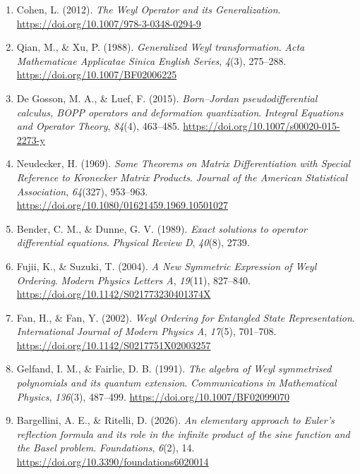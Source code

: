 {\begin{enumerate}
		\item Cohen, L. (2012). \textit{The Weyl Operator and its Generalization}. \url{https://doi.org/10.1007/978-3-0348-0294-9}
		
		\item Qian, M., \& Xu, P. (1988). \textit{Generalized Weyl transformation}. \textit{Acta Mathematicae Applicatae Sinica English Series}, \textit{4}(3), 275--288. \url{https://doi.org/10.1007/BF02006225}
		
		\item De Gosson, M. A., \& Luef, F. (2015). \textit{Born--Jordan pseudodifferential calculus, BOPP operators and deformation quantization}. \textit{Integral Equations and Operator Theory}, \textit{84}(4), 463--485. \url{https://doi.org/10.1007/s00020-015-2273-y}
		
		\item Neudecker, H. (1969). \textit{Some Theorems on Matrix Differentiation with Special Reference to Kronecker Matrix Products}. \textit{Journal of the American Statistical Association}, \textit{64}(327), 953--963. \url{https://doi.org/10.1080/01621459.1969.10501027}
		
		\item Bender, C. M., \& Dunne, G. V. (1989). \textit{Exact solutions to operator differential equations}. \textit{Physical Review D}, \textit{40}(8), 2739.
		
		\item Fujii, K., \& Suzuki, T. (2004). \textit{A New Symmetric Expression of Weyl Ordering}. \textit{Modern Physics Letters A}, \textit{19}(11), 827--840. \url{https://doi.org/10.1142/S021773230401374X}
		
		\item Fan, H., \& Fan, Y. (2002). \textit{Weyl Ordering for Entangled State Representation}. \textit{International Journal of Modern Physics A}, \textit{17}(5), 701--708. \url{https://doi.org/10.1142/S0217751X02003257}
		
		\item Gelfand, I. M., \& Fairlie, D. B. (1991). \textit{The algebra of Weyl symmetrised polynomials and its quantum extension}. \textit{Communications in Mathematical Physics}, \textit{136}(3), 487--499. \url{https://doi.org/10.1007/BF02099070}
		
		\item Bargellini, A. E., \& Ritelli, D. (2026). \textit{An elementary approach to Euler's reflection formula and its role in the infinite product of the sine function and the Basel problem}. \textit{Foundations}, \textit{6}(2), 14. \url{https://doi.org/10.3390/foundations6020014}
		

\end{enumerate}}
